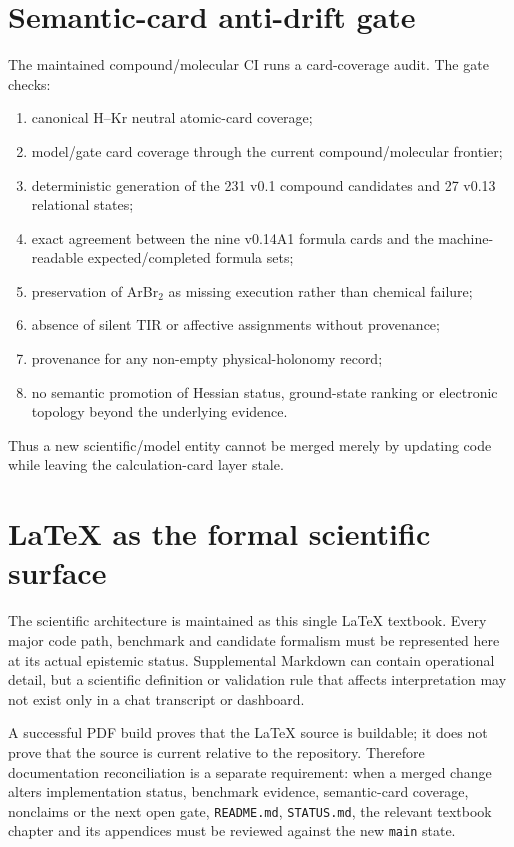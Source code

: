 \section{Semantic-card anti-drift gate}
The maintained compound/molecular CI runs a card-coverage audit.  The gate checks:
\begin{enumerate}
\item canonical H--Kr neutral atomic-card coverage;
\item model/gate card coverage through the current compound/molecular frontier;
\item deterministic generation of the 231 v0.1 compound candidates and 27 v0.13 relational states;
\item exact agreement between the nine v0.14A1 formula cards and the machine-readable expected/completed formula sets;
\item preservation of ArBr$_2$ as missing execution rather than chemical failure;
\item absence of silent TIR or affective assignments without provenance;
\item provenance for any non-empty physical-holonomy record;
\item no semantic promotion of Hessian status, ground-state ranking or electronic topology beyond the underlying evidence.
\end{enumerate}
Thus a new scientific/model entity cannot be merged merely by updating code while leaving the calculation-card layer stale.

\section{LaTeX as the formal scientific surface}
The scientific architecture is maintained as this single LaTeX textbook.  Every major code path, benchmark and candidate formalism must be represented here at its actual epistemic status.  Supplemental Markdown can contain operational detail, but a scientific definition or validation rule that affects interpretation may not exist only in a chat transcript or dashboard.

A successful PDF build proves that the LaTeX source is buildable; it does not prove that the source is current relative to the repository.  Therefore documentation reconciliation is a separate requirement: when a merged change alters implementation status, benchmark evidence, semantic-card coverage, nonclaims or the next open gate, \texttt{README.md}, \texttt{STATUS.md}, the relevant textbook chapter and its appendices must be reviewed against the new \texttt{main} state.

